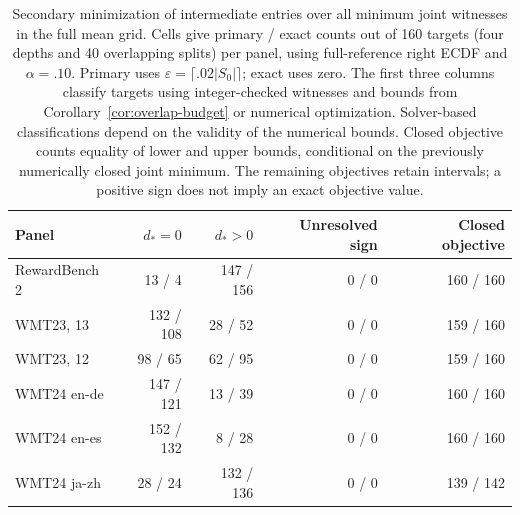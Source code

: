 \begin{table}[t]
\centering\small
\begin{tabular}{lrrrr}
\toprule
Panel & $d_*=0$ & $d_*>0$ & Unresolved sign & Closed objective \\
\midrule
RewardBench 2 & 13 / 4 & 147 / 156 & 0 / 0 & 160 / 160 \\
WMT23, 13 & 132 / 108 & 28 / 52 & 0 / 0 & 159 / 160 \\
WMT23, 12 & 98 / 65 & 62 / 95 & 0 / 0 & 159 / 160 \\
WMT24 en-de & 147 / 121 & 13 / 39 & 0 / 0 & 160 / 160 \\
WMT24 en-es & 152 / 132 & 8 / 28 & 0 / 0 & 160 / 160 \\
WMT24 ja-zh & 28 / 24 & 132 / 136 & 0 / 0 & 139 / 142 \\
\bottomrule
\end{tabular}
\caption{Secondary minimization of intermediate entries over all minimum joint witnesses in the full mean grid. Cells give primary / exact counts out of 160 targets (four depths and 40 overlapping splits) per panel, using full-reference right ECDF and $\alpha=.10$. Primary uses $\varepsilon=\lceil.02|S_0|\rceil$; exact uses zero. The first three columns classify targets using integer-checked witnesses and bounds from Corollary~\ref{cor:overlap-budget} or numerical optimization. Solver-based classifications depend on the validity of the numerical bounds. Closed objective counts equality of lower and upper bounds, conditional on the previously numerically closed joint minimum. The remaining objectives retain intervals; a positive sign does not imply an exact objective value.}
\label{tab:overlap-diagnostic}
\end{table}
